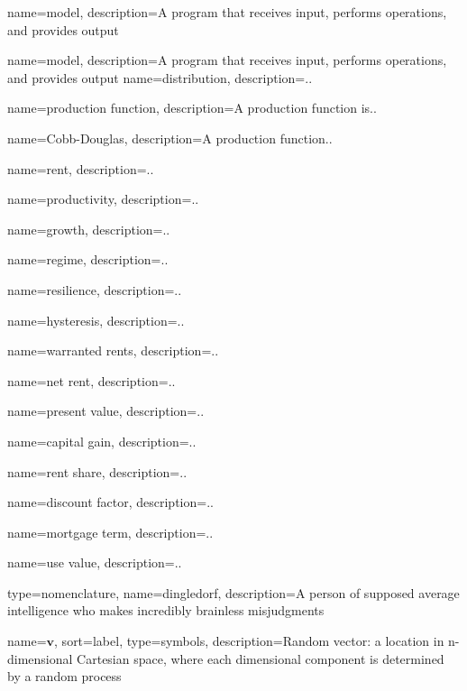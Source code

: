 {
name=model,
description={A program that receives input, performs operations, 
						and provides output}
}

{
name=model,
description={A program that receives input, performs operations, 
						and provides output}
}
{
name=distribution,
description={..}
}

{
name=production function,
description={A production function is..}
}

{
name=Cobb-Douglas,
description={A production function..}
}

{
name=rent,
description={..}
}

{
name=productivity,
description={..}
}

{
name=growth,
description={..}
}

{
name=regime,
description={..}
}

{
name=resilience,
description={..}
}

{
name=hysteresis,
description={..}
}

{
name=warranted rents,
description={..}
}

{
name=net rent,
description={..}
}

{
name=present value,
description={..}
}

{
name=capital gain,
description={..}
}

{
name=rent share,
description={..}
}

{
name=discount factor,
description={..}
}

{
name=mortgage term,
description={..}
}

{
name=use value,
description={..}
}


{
type=nomenclature,
name=dingledorf,
description={A person of supposed average intelligence who makes incredibly brainless misjudgments}
}



{
name={$\mathbf{v}$},
sort={label},
type=symbols,
description={Random vector: a location in n-dimensional Cartesian space, where each dimensional component is determined by a random process}
}